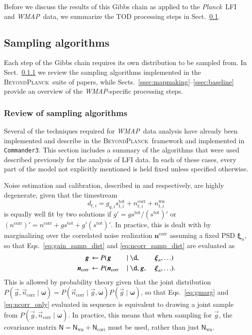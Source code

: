 \documentclass[twocolumn]{../../common/aa}
\def\WMAP{\emph{WMAP}}
\def\Planck{\emph{Planck}}
\def\commanderthree{\texttt{Commander3}}
\newcommand{\g}[0]{\vec{g}}
\newcommand{\bp}{\textsc{BeyondPlanck}}
\newcommand{\ncorr}{\vec n_\mathrm{corr}}
\begin{document}
Before we discuss the results of this Gibbs chain as applied to the \Planck\ LFI and \WMAP\ data, we summarize the TOD processing steps in Sect.~\ref{sec:algorithms}.



\subsection{Sampling algorithms}
\label{sec:algorithms}

Each step of the Gibbs chain requires its own distribution to be sampled from. In Sect.~\ref{ssec:oldsamplers} we review the sampling algorithms implemented in the \bp\ suite of papers, while Sects.~\ref{ssec:mapmaking}--\ref{ssec:baseline} provide an overview of the \WMAP-specific processing steps.

\subsubsection{Review of sampling algorithms}
\label{ssec:oldsamplers}


Several of the techniques required for \WMAP\ data analysis have already been implemented and describe in the \bp\ framework and implemented in \commanderthree. This section includes a summary of the algorithms that were used described previously for the analysis of LFI data. In each of these cases, every part of the model not explicitly mentioned is held fixed unless specified otherwise.

Noise estimation and calibration, described in \citet{bp06} and \citet{bp07} respectively, are highly degenerate, given that the timestream
\begin{equation}
	d_{t,i}=g_{q,i}s_{t,i}^\mathrm{tot}+n_{t,i}^\mathrm{corr}+n_{t,i}^\mathrm{wn}
\end{equation}
is equally well fit by two solutions if $g'=gs^\mathrm{tot}/(s^\mathrm{tot})'$ or ${(n^\mathrm{corr})'=n^\mathrm{corr}+gs^\mathrm{tot}+g'(s^\mathrm{tot})'}$. In practice, this is dealt with by marginalizing over the correlated noise realization $\boldsymbol n^\mathrm{corr}$ assuming a fixed PSD $\boldsymbol\xi_n$, so that Eqs.~\eqref{eq:gain_samp_dist} and \eqref{eq:ncorr_samp_dist} are evaluated as
\begin{alignat}{10}
	\g&\,\leftarrow P(\g&\,\mid\d, &\, &\,&\,\boldsymbol\xi_n,\ldots)
	\label{eq:gmarg}
	\\
	\ncorr&\,\leftarrow P(\ncorr&\,\mid\d, &\,\g, &\,&\,\boldsymbol\xi_n,\ldots).
	\label{eq:ncorr_only}
\end{alignat}
This is allowed by probability theory given that the joint distribution $P(\g,\ncorr\mid\boldsymbol\omega)=P(\ncorr\mid\g,\boldsymbol\omega)P(\g\mid\boldsymbol\omega)$, so that Eqs.~\eqref{eq:gmarg} and \eqref{eq:ncorr_only} evaluated in sequence is equivalent to drawing a joint sample from $P(\g,\ncorr\mid\boldsymbol\omega)$. In practice, this means that when sampling for $\g$, the covariance matrix $\mathsf N=\mathsf N_\textrm{wn}+\mathsf N_\textrm{corr}$ must be used, rather than just $\mathsf N_\mathrm{wn}$.
\end{document}
